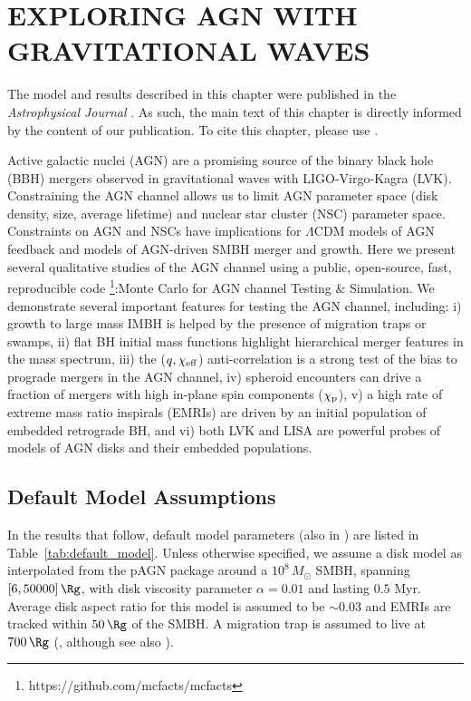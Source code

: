 \section{\texorpdfstring{\MakeUppercase{exploring agn with gravitational waves}}{exploring agn with gravitational waves}}
\label{sec:chapter-agnbbh}


\par The model and results described in this chapter were published in the \textit{Astrophysical Journal} \citep{McKernan+25-mcfactsI}.
As such, the main text of this chapter is directly informed by the content of our publication.
To cite this chapter, please use \citet{McKernan+25-mcfactsI}.


Active galactic nuclei (AGN) are a promising source of the binary black hole (BBH) mergers observed in gravitational waves with LIGO-Virgo-Kagra (LVK).
Constraining the AGN channel allows us to limit AGN parameter space (disk density, size, average lifetime) and nuclear star cluster (NSC) parameter space.
Constraints on AGN and NSCs have implications for $\Lambda$CDM models of AGN feedback and models of AGN-driven SMBH merger and growth.
Here we present several qualitative studies of the AGN channel using a public, open-source, fast, reproducible code \footnote{https://github.com/mcfacts/mcfacts}:Monte Carlo for AGN channel Testing \& Simulation.
We demonstrate several important features for testing the AGN channel, including:
i) growth to large mass IMBH is helped by the presence of migration traps or swamps,
ii) flat BH initial mass functions highlight hierarchical merger features in the mass spectrum,
iii) the ($q,\chi_{\rm eff}$) anti-correlation is a strong test of the bias to prograde mergers in the AGN channel,
iv) spheroid encounters can drive a fraction of mergers with high in-plane spin components ($\chi_{\rm p}$),
v) a high rate of extreme mass ratio inspirals (EMRIs) are driven by an initial population of embedded retrograde BH, and
vi) both LVK and LISA are powerful probes of models of AGN disks and their embedded populations.


\subsection{Default Model Assumptions}
\label{sec:mcfacts-assumptions}

In the results that follow, default model parameters (also in ) are listed in Table~\ref{tab:default_model}. Unless otherwise specified, we assume a \citet{SirkoGoodman03} disk model as interpolated from the pAGN package \citep{Gangardt+24-pAGN} around a $10^{8}\,M_{\odot}$ SMBH, spanning $[6,50000]\,\Rg$, with disk viscosity parameter $\alpha=0.01$ and lasting $0.5$ Myr. Average disk aspect ratio for this model is assumed to be $\sim 0.03$ and EMRIs are tracked within $50\,\Rg$ of the SMBH. A migration trap is assumed to live at $700\,\Rg$ (\citealt{Bellovary+16}, although see also \citealt{Grishin+23}). 

